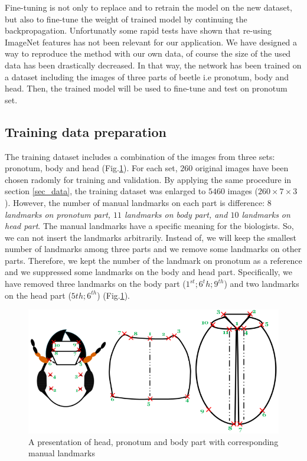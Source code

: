 \documentclass[10pt]{article}
\begin{document}
Fine-tuning is not only to replace and to retrain the model on the new
dataset, but also to fine-tune the weight of trained model by continuing the
backpropagation. Unfortunatly some rapid tests have shown that
re-using ImageNet features has not been relevant for our
application. We have designed a way to reproduce the method with our
own data, of course the size of the used data has been drastically decreased.
In that way, the network has been trained on a dataset including
the images of three parts of beetle i.e pronotum, body and head. Then,
the trained model will be used to fine-tune and test on pronotum set.


\subsection{Training data preparation}
The training dataset includes a combination of the images from three
sets: pronotum, body and head (Fig.\ref{figshape3parts}). For each
set, $260$ original images have been chosen radomly for training and
validation. By applying the same procedure in section \ref{sec_data},
the training dataset was enlarged to $5460$ images ($260 \times 7
\times 3$). However, the number of manual landmarks on each part is
difference: \textit{$8$ landmarks on pronotum part, $11$ landmarks on
  body part, and $10$ landmarks on head part}. The manual landmarks
have a specific meaning for the biologists. So, we can not insert the
landmarks arbitrarily. Instead of, we will keep the smallest number of
landmarks among three parts and we remove some landmarks on other
parts. Therefore, we kept the number of the landmark on pronotum as a
reference and we suppressed some landmarks on the body and head
part. Specifically, we have removed three landmarks on the body part
($1^{st}; 6^{t}h; 9^{th}$) and two landmarks on the head part ($5{th};
6^{th}$) (Fig.\ref{figshape3parts}).


\begin{figure}[htbp]

        \centering
        \includegraphics[scale=0.25]{images/merge}
 
 
    \caption{\small{A presentation of head, pronotum and body part with corresponding manual landmarks}} 
    \label{figshape3parts}
\end{figure}
\end{document}
